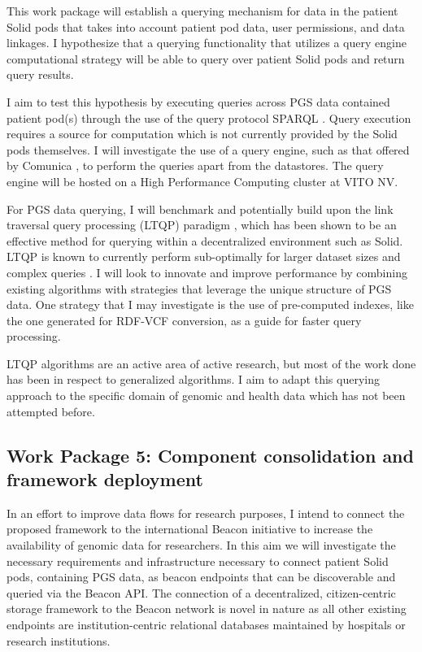 \documentclass[runningheads]{llncs}
\begin{document}
This work package will establish a querying mechanism for data in the patient Solid pods that takes into account patient pod data, user permissions, and data linkages. 
I hypothesize that a querying functionality that utilizes a query engine computational strategy will be able to query over patient Solid pods and return query results.

I aim to test this hypothesis by executing queries across PGS data contained patient pod(s) through the use of the query protocol SPARQL \cite{sparql}.
Query execution requires a source for computation which is not currently provided by the Solid pods themselves.
I will investigate the use of a query engine, such as that offered by Comunica \cite{comunica}, to perform the queries apart from the datastores.
The query engine will be hosted on a High Performance Computing cluster at VITO NV.

For PGS data querying, I will benchmark and potentially build upon the link traversal query processing (LTQP) paradigm \cite{taelman_evaluation_2023}, which has been shown to be an effective method for querying within a decentralized environment such as Solid. 
LTQP is known to currently perform sub-optimally for larger dataset sizes and complex queries \cite{taelman_evaluation_2023}. 
I will look to innovate and improve performance by combining existing algorithms with strategies that leverage the unique structure of PGS data.
One strategy that I may investigate is the use of pre-computed indexes, like the one generated for RDF-VCF conversion, as a guide for faster query processing.

LTQP algorithms are an active area of active research, but most of the work done has been in respect to generalized algorithms.
I aim to adapt this querying approach to the specific domain of genomic and health data which has not been attempted before. 

\subsection{Work Package 5: Component consolidation and framework deployment}

In an effort to improve data flows for research purposes, I intend to connect the proposed framework to the international Beacon initiative \cite{rambla_beacon_2022} to increase the availability of genomic data for researchers. 
In this aim we will investigate the necessary requirements and infrastructure necessary to connect patient Solid pods, containing PGS data, as beacon endpoints that can be discoverable and queried via the Beacon API. 
The connection of a decentralized, citizen-centric storage framework to the Beacon network is novel in nature as all other existing endpoints are institution-centric relational databases maintained by hospitals or research institutions.
\end{document}
